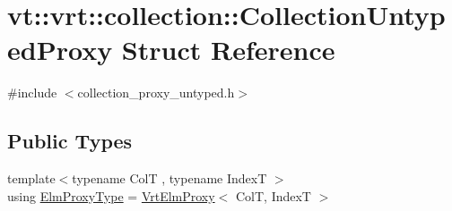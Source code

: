 \hypertarget{structvt_1_1vrt_1_1collection_1_1_collection_untyped_proxy}{}\section{vt\+:\+:vrt\+:\+:collection\+:\+:Collection\+Untyped\+Proxy Struct Reference}
\label{structvt_1_1vrt_1_1collection_1_1_collection_untyped_proxy}


{\ttfamily \#include $<$collection\+\_\+proxy\+\_\+untyped.\+h$>$}

\subsection*{Public Types}
\begin{DoxyCompactItemize}
\item 
{\footnotesize template$<$typename ColT , typename IndexT $>$ }\\using \hyperlink{structvt_1_1vrt_1_1collection_1_1_collection_untyped_proxy_abf73984f3a31218515f9f4806f41cef5}{Elm\+Proxy\+Type} = \hyperlink{structvt_1_1vrt_1_1collection_1_1_vrt_elm_proxy}{Vrt\+Elm\+Proxy}$<$ ColT, IndexT $>$
\end{DoxyCompactItemize}
